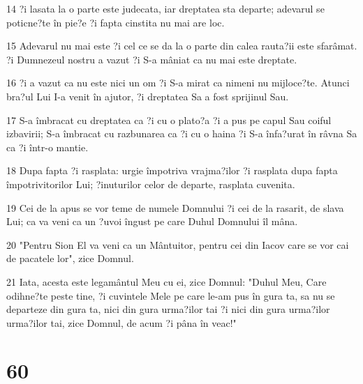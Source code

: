 \par 14 ?i lasata la o parte este judecata, iar dreptatea sta departe; adevarul se poticne?te în pie?e ?i fapta cinstita nu mai are loc.
\par 15 Adevarul nu mai este ?i cel ce se da la o parte din calea rauta?ii este sfarâmat. ?i Dumnezeul nostru a vazut ?i S-a mâniat ca nu mai este dreptate.
\par 16 ?i a vazut ca nu este nici un om ?i S-a mirat ca nimeni nu mijloce?te. Atunci bra?ul Lui I-a venit în ajutor, ?i dreptatea Sa a fost sprijinul Sau.
\par 17 S-a îmbracat cu dreptatea ca ?i cu o plato?a ?i a pus pe capul Sau coiful izbavirii; S-a îmbracat cu razbunarea ca ?i cu o haina ?i S-a înfa?urat în râvna Sa ca ?i într-o mantie.
\par 18 Dupa fapta ?i rasplata: urgie împotriva vrajma?ilor ?i rasplata dupa fapta împotrivitorilor Lui; ?inuturilor celor de departe, rasplata cuvenita.
\par 19 Cei de la apus se vor teme de numele Domnului ?i cei de la rasarit, de slava Lui; ca va veni ca un ?uvoi îngust pe care Duhul Domnului îl mâna.
\par 20 "Pentru Sion El va veni ca un Mântuitor, pentru cei din Iacov care se vor cai de pacatele lor", zice Domnul.
\par 21 Iata, acesta este legamântul Meu cu ei, zice Domnul: "Duhul Meu, Care odihne?te peste tine, ?i cuvintele Mele pe care le-am pus în gura ta, sa nu se departeze din gura ta, nici din gura urma?ilor tai ?i nici din gura urma?ilor urma?ilor tai, zice Domnul, de acum ?i pâna în veac!"

\chapter{60}

